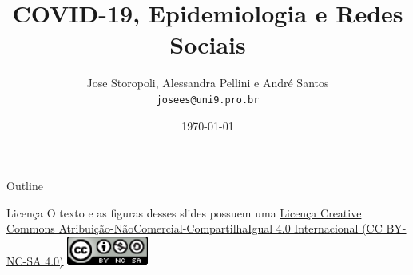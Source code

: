 \documentclass[aspectratio=169]{beamer}                    %
\title[COVID-19, Epidemiologia e Redes Sociais]{COVID-19, Epidemiologia e Redes Sociais}
\author{Jose Storopoli, Alessandra Pellini e André Santos \\
\texttt{josees@uni9.pro.br}}
\institute{Universidade Nove de Julho - UNINOVE}
\date{\today}
\begin{document}
\maketitle

\begin{frame}{Outline}
    \tableofcontents
\end{frame}

\begin{frame}{Licença}
    \centering
    \vfill
    \Large O texto e as figuras desses slides possuem uma
    \href{https://creativecommons.org/licenses/by-nc-sa/4.0/deed.pt}{Licença
    Creative Commons
    Atribuição-NãoComercial-CompartilhaIgual 4.0 Internacional (CC BY-NC-SA 4.0)}
    \vfill
    \includegraphics[width = 0.2\textwidth]{CC_NC_SA.png}
\end{frame}
\end{document}
